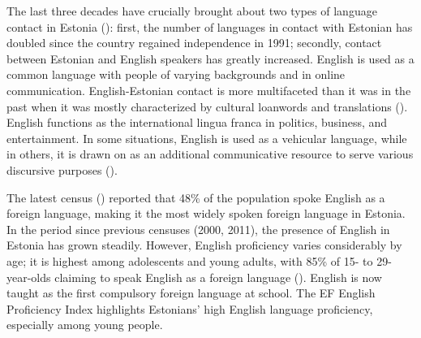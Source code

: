 \documentclass[output=paper]{langscibook}
\begin{document}
The last three decades have crucially brought about two types of language contact in Estonia (\citealt{PraakliKoreinik2020}): first, the number of languages in contact with Estonian has doubled since the country regained independence in 1991; secondly, contact between Estonian and English speakers has greatly increased. English is used as a common language with people of varying backgrounds and in online communication. English-Estonian contact is more multifaceted than it was in the past when it was mostly characterized by cultural loanwords and translations (\citealt{Jogi2014}). English functions as the international lingua franca in politics, business, and entertainment. In some situations, English is used as a vehicular language, while in others, it is drawn on as an additional communicative resource to serve various discursive purposes (\citealt{Kask2021, PraakliEtAl2022, VihmanEtAl2022}).

The latest census (\citealt{Statistics2022population}) reported that 48\% of the population spoke English as a foreign language, making it the most widely spoken foreign language in Estonia. In the period since previous censuses (2000, 2011), the presence of English in Estonia has grown steadily. However, English proficiency varies considerably by age; it is highest among adolescents and young adults, with 85\% of 15- to 29-year-olds claiming to speak English as a foreign language (\citealt{Statistics2022demographics}). English is now taught as the first compulsory foreign language at school. The EF English Proficiency Index \citet{Education2022} highlights Estonians’ high English language proficiency, especially among young people.
\end{document}

